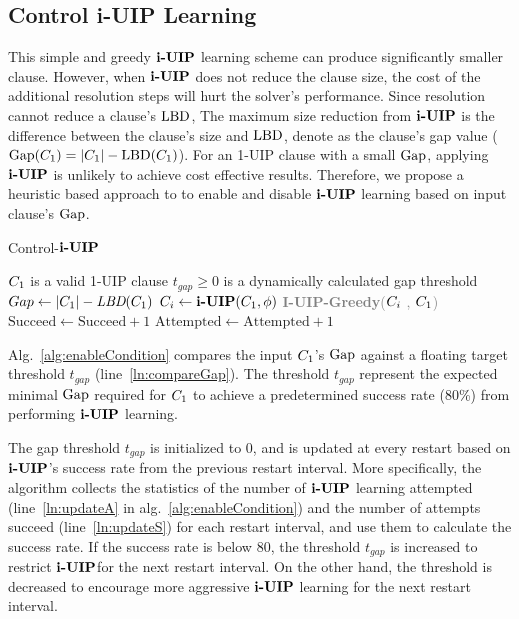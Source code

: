 \subsection{Control i-UIP Learning}
This simple and greedy $\textbf{i-UIP}$ learning scheme can produce significantly smaller clause. However, when $\textbf{i-UIP}$ does not reduce the clause size, the cost of the additional resolution steps will hurt the solver's performance. Since resolution cannot reduce a clause's $\text{LBD}$, The maximum size reduction from $\textbf{i-UIP}$ is the difference between the clause's size and $\text{LBD}$, denote as the clause's gap value ($\text{Gap}(C_{1}) = |C_{1}| - \text{LBD}(C_{1})$). For an 1-UIP clause with a small $\text{Gap}$, applying $\textbf{i-UIP}$ is unlikely to achieve cost effective results. Therefore, we propose a heuristic based approach to to enable and disable $\textbf{i-UIP}$ learning based on input clause's $\text{Gap}$.

\begin{algorithm}[t]
\caption{Control-$\textbf{i-UIP}$}\label{alg:enableCondition}
\begin{algorithmic}[1]
\Require  $C_{1}$ is a valid 1-UIP clause
\Require  $ t_{gap} \ge 0$ is a dynamically calculated gap threshold
    \State $Gap \gets |C_{1}| - \textit{LBD}(C_{1})$
      \label{ln:compareGap}
        \State $C_{i} \gets \textbf{i-UIP}(C_{1}, \phi)$
        \State \textcolor{gray}{\textbf{I-UIP-Greedy}($C_{i}$ , $C_{1}$)}  
        \If {$|\iUIPClause| < |\oneUIPClause|$} 
            \State $\text{Succeed} \gets \text{Succeed}+1$ \label{ln:updateS}
        \EndIf
        \State $\text{Attempted} \gets \text{Attempted}+1$ \label{ln:updateA}
     \EndIf
\EndProcedure
\end{algorithmic}
\end{algorithm}

Alg.~\ref{alg:enableCondition} compares the input $C_{1}$'s $\text{Gap}$ against a floating target threshold $t_{gap}$ (line~\ref{ln:compareGap}). The threshold $t_{gap}$ represent the expected minimal $\text{Gap}$ required for $C_{1}$ to achieve a predetermined success rate (80\%) from performing $\textbf{i-UIP}$ learning. 

The gap threshold $t_{gap}$ is initialized to 0, and is updated at every restart based on $\textbf{i-UIP}$'s success rate from the previous restart interval. More specifically, the algorithm collects the statistics of the number of $\textbf{i-UIP}$ learning attempted (line~\ref{ln:updateA} in alg.~\ref{alg:enableCondition}) and the number of attempts succeed (line~\ref{ln:updateS}) for each restart interval, and use them to calculate the success rate. If the success rate is below 80, the threshold $t_{gap}$ is increased to restrict $\textbf{i-UIP}$for the next restart interval. On the other hand, the threshold is decreased to encourage more aggressive $\textbf{i-UIP}$ learning for the next restart interval.

